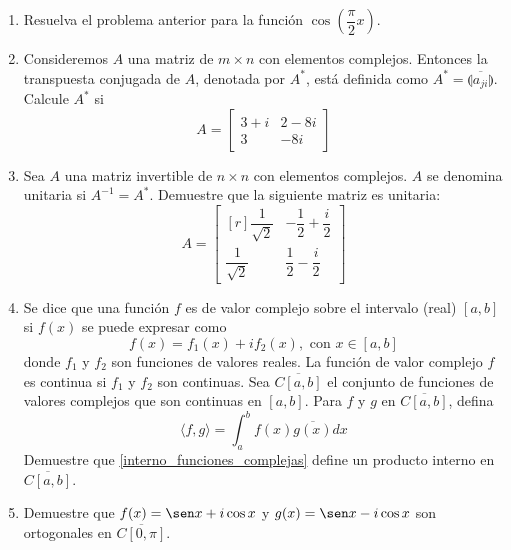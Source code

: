 \begin{enumerate}[start=62]
    \item Resuelva el problema anterior para la función $\cos \left(\dfrac{\pi}{2} x\right)$.
    \item Consideremos $A$ una matriz de $m \times n$ con elementos complejos. Entonces la transpuesta conjugada de $A$, denotada por $A^{*}$, está definida como $A^{*} = \overline{\llparenthesis a_{j i} \rrparenthesis}$. Calcule $A^{*}$ si
    $$A=\begin{bmatrix}
        3+i & 2-8 i \\
        3 & -8 i
    \end{bmatrix}$$
    \item Sea $A$ una matriz invertible de $n \times n$ con elementos complejos. $A$ se denomina unitaria si $A^{-1}=A^{*}$. Demuestre que la siguiente matriz es unitaria:
    $$A=\begin{bmatrix*}[r]
        \dfrac{1}{\sqrt{2}} & -\dfrac{1}{2}+\dfrac{i}{2} \\[2mm]
        \dfrac{1}{\sqrt{2}} & \dfrac{1}{2}-\dfrac{i}{2}
    \end{bmatrix*}$$
    \item Se dice que una función $f$ es de valor complejo sobre el intervalo (real) $[a, b]$ si $f(x)$ se puede expresar como
    $$f(x)=f_{1}(x)+i f_{2}(x), \text{ con } x \in[a, b]$$
    donde $f_{1}$ y $f_{2}$ son funciones de valores reales. La función de valor complejo $f$ es continua si $f_{1}$ y $f_{2}$ son continuas. Sea $\overline{C[a, b]}$ el conjunto de funciones de valores complejos que son continuas en $[a, b]$. Para $f$ y $g$ en $\overline{C[a, b]}$, defina
    \begin{equation}
        \langle f, g\rangle=\int_{a}^{b} f(x) \overline{g(x)} d x \label{interno_funciones_complejas}
    \end{equation}
    Demuestre que \eqref{interno_funciones_complejas} define un producto interno en $\overline{C[a, b]}$.
    \item Demuestre que $f(x)=\sen x+i \cos x$ y $g(x)=\sen x-i \cos x$ son ortogonales en $\overline{C[0, \pi]}$.
\end{enumerate}